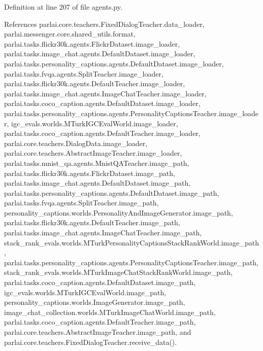 Definition at line 207 of file agents.\+py.



References parlai.\+core.\+teachers.\+Fixed\+Dialog\+Teacher.\+data\+\_\+loader, parlai.\+messenger.\+core.\+shared\+\_\+utils.\+format, parlai.\+tasks.\+flickr30k.\+agents.\+Flickr\+Dataset.\+image\+\_\+loader, parlai.\+tasks.\+image\+\_\+chat.\+agents.\+Default\+Dataset.\+image\+\_\+loader, parlai.\+tasks.\+personality\+\_\+captions.\+agents.\+Default\+Dataset.\+image\+\_\+loader, parlai.\+tasks.\+fvqa.\+agents.\+Split\+Teacher.\+image\+\_\+loader, parlai.\+tasks.\+flickr30k.\+agents.\+Default\+Teacher.\+image\+\_\+loader, parlai.\+tasks.\+image\+\_\+chat.\+agents.\+Image\+Chat\+Teacher.\+image\+\_\+loader, parlai.\+tasks.\+coco\+\_\+caption.\+agents.\+Default\+Dataset.\+image\+\_\+loader, parlai.\+tasks.\+personality\+\_\+captions.\+agents.\+Personality\+Captions\+Teacher.\+image\+\_\+loader, igc\+\_\+evals.\+worlds.\+M\+Turk\+I\+G\+C\+Eval\+World.\+image\+\_\+loader, parlai.\+tasks.\+coco\+\_\+caption.\+agents.\+Default\+Teacher.\+image\+\_\+loader, parlai.\+core.\+teachers.\+Dialog\+Data.\+image\+\_\+loader, parlai.\+core.\+teachers.\+Abstract\+Image\+Teacher.\+image\+\_\+loader, parlai.\+tasks.\+mnist\+\_\+qa.\+agents.\+Mnist\+Q\+A\+Teacher.\+image\+\_\+path, parlai.\+tasks.\+flickr30k.\+agents.\+Flickr\+Dataset.\+image\+\_\+path, parlai.\+tasks.\+image\+\_\+chat.\+agents.\+Default\+Dataset.\+image\+\_\+path, parlai.\+tasks.\+personality\+\_\+captions.\+agents.\+Default\+Dataset.\+image\+\_\+path, parlai.\+tasks.\+fvqa.\+agents.\+Split\+Teacher.\+image\+\_\+path, personality\+\_\+captions.\+worlds.\+Personality\+And\+Image\+Generator.\+image\+\_\+path, parlai.\+tasks.\+flickr30k.\+agents.\+Default\+Teacher.\+image\+\_\+path, parlai.\+tasks.\+image\+\_\+chat.\+agents.\+Image\+Chat\+Teacher.\+image\+\_\+path, stack\+\_\+rank\+\_\+evals.\+worlds.\+M\+Turk\+Personality\+Captions\+Stack\+Rank\+World.\+image\+\_\+path, parlai.\+tasks.\+personality\+\_\+captions.\+agents.\+Personality\+Captions\+Teacher.\+image\+\_\+path, stack\+\_\+rank\+\_\+evals.\+worlds.\+M\+Turk\+Image\+Chat\+Stack\+Rank\+World.\+image\+\_\+path, parlai.\+tasks.\+coco\+\_\+caption.\+agents.\+Default\+Dataset.\+image\+\_\+path, igc\+\_\+evals.\+worlds.\+M\+Turk\+I\+G\+C\+Eval\+World.\+image\+\_\+path, personality\+\_\+captions.\+worlds.\+Image\+Generator.\+image\+\_\+path, image\+\_\+chat\+\_\+collection.\+worlds.\+M\+Turk\+Image\+Chat\+World.\+image\+\_\+path, parlai.\+tasks.\+coco\+\_\+caption.\+agents.\+Default\+Teacher.\+image\+\_\+path, parlai.\+core.\+teachers.\+Abstract\+Image\+Teacher.\+image\+\_\+path, and parlai.\+core.\+teachers.\+Fixed\+Dialog\+Teacher.\+receive\+\_\+data().

